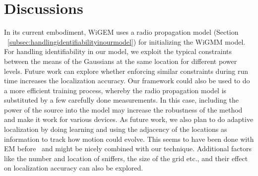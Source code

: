 \section{Discussions}
\label{sec:discussion}


In its current embodiment, WiGEM uses a radio propagation model (Section ~\ref{subsec:handlingidentifiabilityinourmodel}) for initializing the WiGMM model. For handling identifiability in our model, we exploit the typical constraints between the means of the Gaussians at the same location for different power levels. Future work can explore whether enforcing similar  constraints during run time increases the localization accuracy. Our framework could also be used to do a more efficient training process, whereby the radio propagation model is substituted by a few carefully done measurements. In this case, including the power of the source into the model may increase the robustness of the method and make it work for various devices. As future work, we also plan to do adaptive localization by doing learning and using the adjacency of the locations as information to track how motion could evolve. This seems to have been done with EM before~\cite{Addesso:2010:ALT:1856330.1856381} and might be nicely combined with our technique. Additional factors like the number and location of sniffers, the size of the grid etc., and their effect on localization accuracy can also be explored.
%
%
%
%
